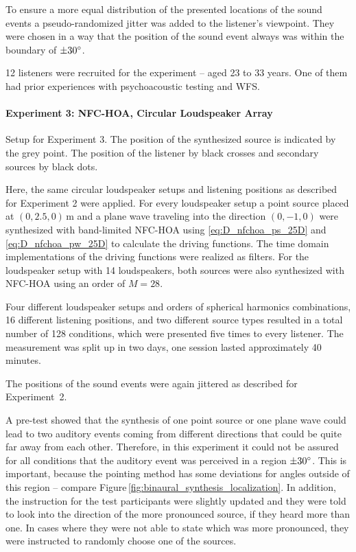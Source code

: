 To ensure a more equal distribution of the presented locations of the sound
events a pseudo-randomized jitter was added to the listener's viewpoint.
They were chosen in a way that the position of the sound event always was within
the boundary of $\pm 30^\circ$.

12 listeners were recruited for the experiment -- aged 23 to 33 years.
One of them had prior experiences with psychoacoustic testing and \ac{WFS}.


\paragraph{Experiment 3: \ac{NFC-HOA}, Circular Loudspeaker Array}
\label{sec:experiment3_nfchoa_circular_array}
%
\begin{marginfigure}
    \ft
    
    \caption{Setup for Experiment 3. The position of the synthesized
    source is indicated by the grey point. The position of the listener by black
    crosses and secondary sources by black dots.
        }
    \label{fig:setup_hoa_circular_array}
\end{marginfigure}
%
Here, the same circular loudspeaker setups and listening positions as described for
Experiment 2 were applied. For every loudspeaker setup a point source placed at
$(0,2.5,0)$\,m and a plane wave traveling into the direction
$(0,-1,0)$ were synthesized with band-limited \ac{NFC-HOA} using
\eqref{eq:D_nfchoa_ps_25D} and
\eqref{eq:D_nfchoa_pw_25D} to calculate the driving functions. The time domain
implementations of the driving functions were realized as filters.
For the loudspeaker setup with 14 loudspeakers, both sources were
also synthesized with \ac{NFC-HOA} using an order of $M = 28$.

Four different loudspeaker setups and orders of spherical harmonics
combinations, 16 different listening positions, and two different source types
resulted in a total number of 128 conditions, which were presented five times to
every listener. The measurement was split up in two days, one session lasted
approximately 40 minutes.

The positions of the sound events were again jittered as described for
Experiment~2.

A pre-test showed that the synthesis of one point source or one plane wave
could lead to two auditory events coming from different directions that could be
quite far away from each other. Therefore, in this experiment it could not be
assured for all conditions that the auditory event was perceived in a region $\pm
30^\circ$. This is important, because the pointing method has some
deviations for angles outside of this region -- compare
Figure\,\ref{fig:binaural_synthesis_localization}.
In addition, the instruction for the test participants were slightly updated and
they were told to look into the direction of the more pronounced source,
if they heard more than one. In cases where they were not able to state which
was
more pronounced, they were instructed to randomly choose one of the sources.


